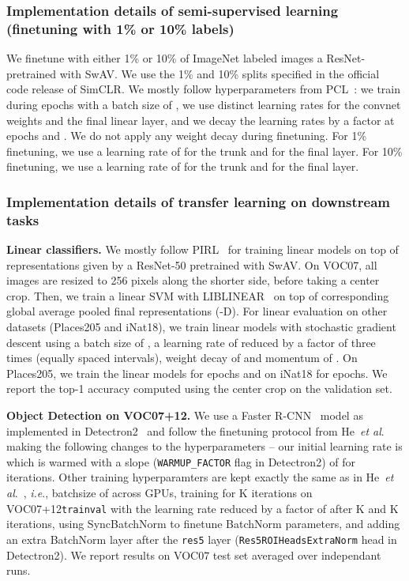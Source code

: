\documentclass{article}
\def\onedot{.}
\def\ie{\emph{i.e}\onedot} \def\Ie{\emph{I.e}\onedot}
\def\etal{\emph{et al}\onedot}
\def\OURS{SwAV\xspace}
\newcommand{\iNat}{iNat18\xspace}
\newcommand{\VOCseven}{VOC07\xspace}
\newcommand{\VOCseventwelve}{VOC07+12\xspace}
\newcommand{\Places}{Places205\xspace}
\begin{document}
\subsubsection{Implementation details of semi-supervised learning (finetuning with 1\% or 10\% labels)}
We finetune with either 1\% or 10\% of ImageNet labeled images a ResNet- pretrained with \OURS.
We use the 1\% and 10\% splits specified in the official code release of SimCLR.
We mostly follow hyperparameters from PCL~\cite{li2020prototypical}: we train during  epochs with a batch size of , we use distinct learning rates for the convnet weights and the final linear layer, and we decay the learning rates by a factor  at epochs  and .
We do not apply any weight decay during finetuning.
For 1\% finetuning, we use a learning rate of  for the trunk and  for the final layer.
For 10\% finetuning, we use a learning rate of  for the trunk and  for the final layer.

\subsubsection{Implementation details of transfer learning on downstream tasks}
\par \noindent \textbf{Linear classifiers.} We mostly follow PIRL~\cite{misra2019self} for training linear models on top of representations given by a ResNet-50 pretrained with \OURS.
On \VOCseven, all images are resized to 256 pixels along the shorter side, before taking a  center crop.
Then, we train a linear SVM with LIBLINEAR~\cite{fan2008liblinear} on top of corresponding global average pooled final representations (-D).
For linear evaluation on other datasets (\Places and \iNat), we train linear models with stochastic gradient descent using a batch size of , a learning rate of  reduced by a factor of  three times (equally spaced intervals), weight decay of  and momentum of .
On \Places, we train the linear models for  epochs and on \iNat for  epochs. We report the top-1 accuracy computed using the  center crop on the validation set.

\par \noindent \textbf{Object Detection on \VOCseventwelve.} We use a Faster R-CNN~\cite{ren2015faster} model as implemented in Detectron2~\cite{wu2019detectron2} and follow the finetuning protocol from He~\etal~\cite{he2019momentum} making the following changes to the hyperparameters -- our initial learning rate is  which is warmed with a slope (\texttt{WARMUP\_FACTOR} flag in Detectron2) of  for  iterations.
Other training hyperparamters are kept exactly the same as in He~\etal~\cite{he2019momentum}, \ie, batchsize of  across  GPUs, training for K iterations on \VOCseventwelve \texttt{trainval} with the learning rate reduced by a factor of  after K and K iterations, using SyncBatchNorm to finetune BatchNorm parameters, and adding an extra BatchNorm layer after the \texttt{res5} layer (\texttt{Res5ROIHeadsExtraNorm} head in Detectron2).
We report results on \VOCseven test set averaged over  independant runs.
\end{document}
